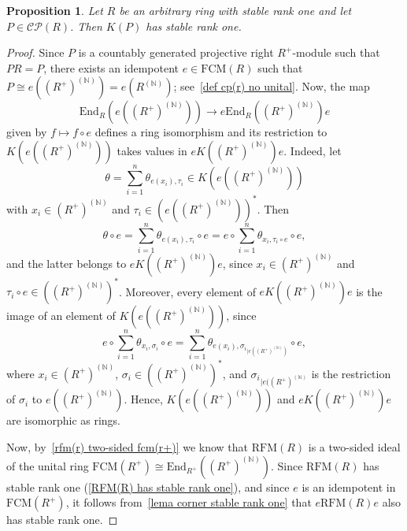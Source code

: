 \documentclass[11pt]{amsart}
\numberwithin{equation}{section}
\newtheorem{prp}[prpCt]{Proposition}
\theoremstyle{definition}
\theoremstyle{plain}
\theoremstyle{definition}
\begin{document}
\begin{prp} \label{k(p) te rang estable 1}
Let $R$ be an arbitrary ring with stable rank one and let $P \in \mathcal{CP}(R)$. Then $K(P)$ has stable rank one. 
\end{prp}

\begin{proof}
Since $P$ is a countably generated projective right $R^+$-module such that $PR = P$, there exists an idempotent $e \in \mathrm{FCM}(R)$ such that $P \cong e((R^{+})^{(\mathbb{N})}) = e(R^{(\mathbb{N})})$; see~\autoref{def cp(r) no unital}. Now, the map 
\begin{equation*}
    \mathrm{End}_R(e((R^+)^{(\mathbb{N})})) \rightarrow e\mathrm{End}_R((R^+)^{(\mathbb{N})})e 
\end{equation*}
given by $f \mapsto f \circ e$ defines a ring isomorphism and its restriction to $K(e((R^+)^{(\mathbb{N})}))$ takes values in $eK((R^+)^{(\mathbb{N})})e$. Indeed, 
let 
\begin{equation*}
    \theta = \sum_{i = 1}^n \theta_{e(x_i), \tau_i} \in K(e((R^+)^{(\mathbb{N})}))
\end{equation*}
with $x_i \in (R^+)^{(\mathbb{N})}$ and $\tau_i \in (e((R^+)^{(\mathbb{N})}))^*$. Then 
\begin{equation*}
    \theta \circ e = \sum_{i = 1}^n \theta_{e(x_i), \tau_i} \circ e = e \circ \sum_{i = 1}^n \theta_{x_i, \tau_i \circ e} \circ e,
\end{equation*}
and the latter belongs to $eK((R^+)^{(\mathbb{N})})e$, since $x_i \in (R^+)^{(\mathbb{N})}$ and $\tau_i\circ e \in ((R^+)^{(\mathbb{N})})^*$. Moreover, every element of $eK((R^+)^{(\mathbb{N})})e$ is the image of an element of 
$K(e((R^+)^{(\mathbb{N})}))$, since 
\begin{equation*}
    e \circ \sum_{i = 1}^n \theta_{x_i, \sigma_i} \circ e = \sum_{i = 1}^n \theta_{e(x_i), {\sigma_i}_{|e((R^+)^{(\mathbb{N})})}} \circ e,
\end{equation*}
where $x_i \in (R^+)^{(\mathbb{N})}$, $\sigma_i \in ((R^+)^{(\mathbb{N})})^*$, and ${\sigma_i}_{|e((R^+)^{(\mathbb{N})}}$ is the restriction of $\sigma_i$ to $e((R^+)^{(\mathbb{N})})$. Hence, $K(e((R^+)^{(\mathbb{N})}))$ and $eK((R^+)^{(\mathbb{N})})e$ are isomorphic as rings. 

Now, by~\autoref{rfm(r) two-sided fcm(r+)} we know that $\mathrm{RFM}(R)$ is a two-sided ideal of the unital ring $\mathrm{FCM}(R^+) \cong \mathrm{End}_{R^+}((R^+)^{(\mathbb{N})})$. Since $\mathrm{RFM}(R)$ has stable rank one (\autoref{RFM(R) has stable rank one}), and since $e$ is an idempotent in $\mathrm{FCM}(R^+)$, it follows from~\autoref{lema corner stable rank one} that $e\mathrm{RFM}(R)e$ also has stable rank one. 


\end{proof}
\end{document}
